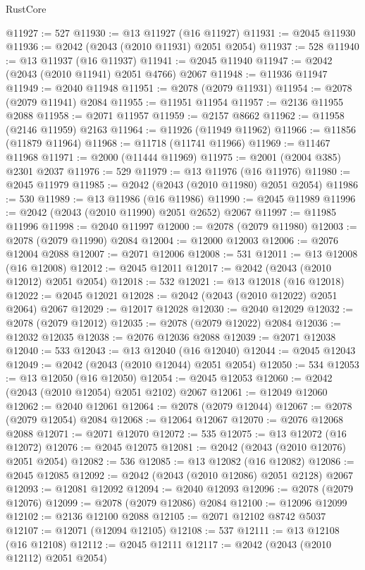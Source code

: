 \begin{lexlean}{RustCore}
\begin{coremodule}
@11927 := 527
@11930 := @13 @11927 (@16 @11927)
@11931 := @2045 @11930
@11936 := @2042 (@2043 (@2010 @11931) @2051 @2054)
@11937 := 528
@11940 := @13 @11937 (@16 @11937)
@11941 := @2045 @11940
@11947 := @2042 (@2043 (@2010 @11941) @2051 @4766) @2067
@11948 := @11936 @11947
@11949 := @2040 @11948
@11951 := @2078 (@2079 @11931)
@11954 := @2078 (@2079 @11941) @2084
@11955 := @11951 @11954
@11957 := @2136 @11955 @2088
@11958 := @2071 @11957
@11959 := @2157 @8662
@11962 := @11958 (@2146 @11959) @2163
@11964 := @11926 (@11949 @11962)
@11966 := @11856 (@11879 @11964)
@11968 := @11718 (@11741 @11966)
@11969 := @11467 @11968
@11971 := @2000 (@11444 @11969)
@11975 := @2001 (@2004 @385) @2301 @2037
@11976 := 529
@11979 := @13 @11976 (@16 @11976)
@11980 := @2045 @11979
@11985 := @2042 (@2043 (@2010 @11980) @2051 @2054)
@11986 := 530
@11989 := @13 @11986 (@16 @11986)
@11990 := @2045 @11989
@11996 := @2042 (@2043 (@2010 @11990) @2051 @2652) @2067
@11997 := @11985 @11996
@11998 := @2040 @11997
@12000 := @2078 (@2079 @11980)
@12003 := @2078 (@2079 @11990) @2084
@12004 := @12000 @12003
@12006 := @2076 @12004 @2088
@12007 := @2071 @12006
@12008 := 531
@12011 := @13 @12008 (@16 @12008)
@12012 := @2045 @12011
@12017 := @2042 (@2043 (@2010 @12012) @2051 @2054)
@12018 := 532
@12021 := @13 @12018 (@16 @12018)
@12022 := @2045 @12021
@12028 := @2042 (@2043 (@2010 @12022) @2051 @2064) @2067
@12029 := @12017 @12028
@12030 := @2040 @12029
@12032 := @2078 (@2079 @12012)
@12035 := @2078 (@2079 @12022) @2084
@12036 := @12032 @12035
@12038 := @2076 @12036 @2088
@12039 := @2071 @12038
@12040 := 533
@12043 := @13 @12040 (@16 @12040)
@12044 := @2045 @12043
@12049 := @2042 (@2043 (@2010 @12044) @2051 @2054)
@12050 := 534
@12053 := @13 @12050 (@16 @12050)
@12054 := @2045 @12053
@12060 := @2042 (@2043 (@2010 @12054) @2051 @2102) @2067
@12061 := @12049 @12060
@12062 := @2040 @12061
@12064 := @2078 (@2079 @12044)
@12067 := @2078 (@2079 @12054) @2084
@12068 := @12064 @12067
@12070 := @2076 @12068 @2088
@12071 := @2071 @12070
@12072 := 535
@12075 := @13 @12072 (@16 @12072)
@12076 := @2045 @12075
@12081 := @2042 (@2043 (@2010 @12076) @2051 @2054)
@12082 := 536
@12085 := @13 @12082 (@16 @12082)
@12086 := @2045 @12085
@12092 := @2042 (@2043 (@2010 @12086) @2051 @2128) @2067
@12093 := @12081 @12092
@12094 := @2040 @12093
@12096 := @2078 (@2079 @12076)
@12099 := @2078 (@2079 @12086) @2084
@12100 := @12096 @12099
@12102 := @2136 @12100 @2088
@12105 := @2071 @12102 @8742 @5037
@12107 := @12071 (@12094 @12105)
@12108 := 537
@12111 := @13 @12108 (@16 @12108)
@12112 := @2045 @12111
@12117 := @2042 (@2043 (@2010 @12112) @2051 @2054)

\end{coremodule}
\end{lexlean}

